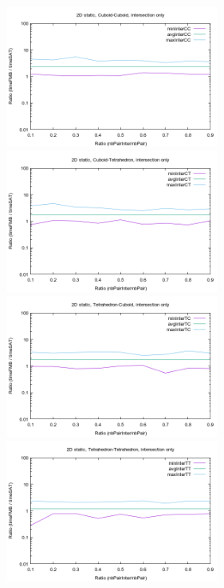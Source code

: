 \documentclass[12pt, a4paper]{article}
\begin{document}
\begin{center}
\begin{figure}[H]
\centering\includegraphics[width=7cm]{../Results/qualification2DCCinter.png}
\centering\includegraphics[width=7cm]{../Results/qualification2DCTinter.png}
\centering\includegraphics[width=7cm]{../Results/qualification2DTCinter.png}
\centering\includegraphics[width=7cm]{../Results/qualification2DTTinter.png}
\end{figure}
\end{center}
\end{document}
